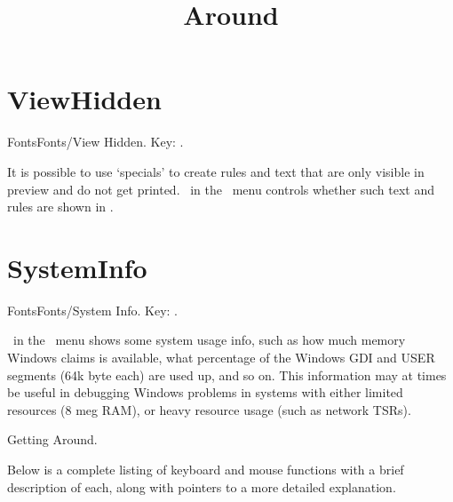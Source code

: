 \newpage

\section{ViewHidden}{Fonts}Fonts/View Hidden. Key: \none.

It is possible to use `specials' to create rules and text that are
only visible in preview and do not get printed.
\ in the \ menu controls whether such
text and rules are shown in .
    \bigskip

\section{SystemInfo}{Fonts}Fonts/System Info. Key: \none.

\ in the \ menu shows some system usage
info, such as how much memory Windows claims is available,
what percentage of the Windows GDI and USER segments (64k byte each)
are used up, and so on.  This information may at times be useful
in debugging Windows problems in systems with either limited resources
(8 meg RAM), or heavy resource usage (such as network TSRs).

\newpage

\title{Around}Getting Around.

Below is a complete %
listing of %
keyboard and mouse functions with a brief description of each, along
with pointers to a more detailed explanation.
   \bigskip 

